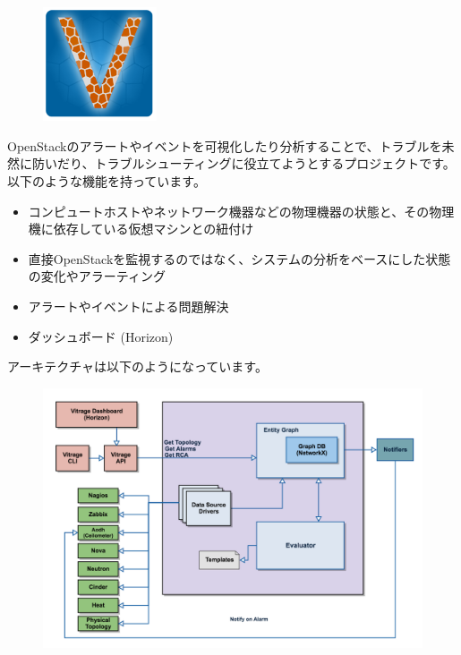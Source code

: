 \begin{figure}
	\begin{center}
		\includegraphics[width=0.3\textwidth]{img/Vitrage_logo_finaly.png}
	\end{center}
\end{figure}

OpenStackのアラートやイベントを可視化したり分析することで、トラブルを未然に防いだり、トラブルシューティングに役立てようとするプロジェクトです。以下のような機能を持っています。

\begin{itemize}
	\item コンピュートホストやネットワーク機器などの物理機器の状態と、その物理機に依存している仮想マシンとの紐付け
	\item 直接OpenStackを監視するのではなく、システムの分析をベースにした状態の変化やアラーティング
	\item アラートやイベントによる問題解決
	\item ダッシュボード (Horizon)
\end{itemize}

アーキテクチャは以下のようになっています。

\begin{figure}[htb]
	\begin{center}
		\includegraphics[width=\textwidth]{img/Vitrage-high_level_architecture2.png}
	\end{center}
\end{figure}

